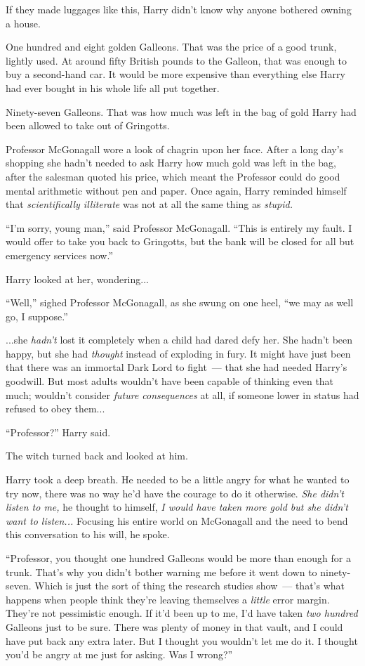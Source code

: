 If they made luggages like this, Harry didn't know why anyone bothered owning a house.

One hundred and eight golden Galleons. That was the price of a good trunk, lightly used. At around fifty British pounds to the Galleon, that was enough to buy a second-hand car. It would be more expensive than everything else Harry had ever bought in his whole life all put together.

Ninety-seven Galleons. That was how much was left in the bag of gold Harry had been allowed to take out of Gringotts.

Professor McGonagall wore a look of chagrin upon her face. After a long day's shopping she hadn't needed to ask Harry how much gold was left in the bag, after the salesman quoted his price, which meant the Professor could do good mental arithmetic without pen and paper. Once again, Harry reminded himself that \emph{scientifically illiterate} was not at all the same thing as \emph{stupid.}

``I'm sorry, young man,'' said Professor McGonagall. ``This is entirely my fault. I would offer to take you back to Gringotts, but the bank will be closed for all but emergency services now.''

Harry looked at her, wondering...

``Well,'' sighed Professor McGonagall, as she swung on one heel, ``we may as well go, I suppose.''

...she \emph{hadn't} lost it completely when a child had dared defy her. She hadn't been happy, but she had \emph{thought} instead of exploding in fury. It might have just been that there was an immortal Dark Lord to fight~--- that she had needed Harry's goodwill. But most adults wouldn't have been capable of thinking even that much; wouldn't consider \emph{future consequences} at all, if someone lower in status had refused to obey them...

``Professor?'' Harry said.

The witch turned back and looked at him.

Harry took a deep breath. He needed to be a little angry for what he wanted to try now, there was no way he'd have the courage to do it otherwise. \emph{She didn't listen to me,} he thought to himself, \emph{I would have taken more gold but she didn't want to listen...} Focusing his entire world on McGonagall and the need to bend this conversation to his will, he spoke.

``Professor, you thought one hundred Galleons would be more than enough for a trunk. That's why you didn't bother warning me before it went down to ninety-seven. Which is just the sort of thing the research studies show~--- that's what happens when people think they're leaving themselves a \emph{little} error margin. They're not pessimistic enough. If it'd been up to me, I'd have taken \emph{two hundred} Galleons just to be sure. There was plenty of money in that vault, and I could have put back any extra later. But I thought you wouldn't let me do it. I thought you'd be angry at me just for asking. Was I wrong?''

